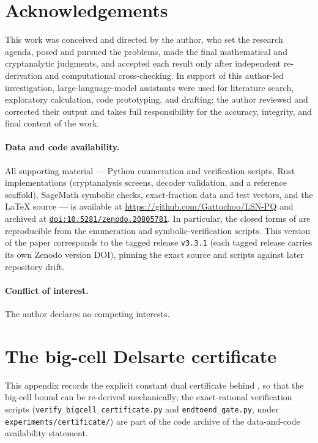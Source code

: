 \documentclass[11pt,a4paper]{article}
\theoremstyle{plain}
\theoremstyle{definition}
\begin{document}

\section*{Acknowledgements}
This work was conceived and directed by the author, who set the research agenda, posed and pursued the problems, made the final mathematical and cryptanalytic judgments, and accepted each result only after independent re-derivation and computational cross-checking. In support of this author-led investigation, large-language-model assistants were used for literature search, exploratory calculation, code prototyping, and drafting; the author reviewed and corrected their output and takes full responsibility for the accuracy, integrity, and final content of the work.

\paragraph{\textbf{Data and code availability.}} All supporting material --- Python enumeration and verification scripts, Rust implementations (cryptanalysis screens, decoder validation, and a reference scaffold), SageMath symbolic checks, exact-fraction data and test vectors, and the \LaTeX{} source --- is available at \url{https://github.com/Gattochoo/LSN-PQ} and archived at \href{https://doi.org/10.5281/zenodo.20805781}{\texttt{doi:10.5281/zenodo.20805781}}. In particular, the closed forms of  are reproducible from the enumeration and symbolic-verification scripts. This version of the paper corresponds to the tagged release \texttt{v3.3.1} (each tagged release carries its own Zenodo version DOI), pinning the exact source and scripts against later repository drift.

\paragraph{\textbf{Conflict of interest.}} The author declares no competing interests.

\section{The big-cell Delsarte certificate}\label{app:bigcell-cert}
This appendix records the explicit constant dual certificate behind , so that the big-cell bound can be re-derived mechanically; the exact-rational verification scripts (\texttt{verify\_bigcell\_certificate.py} and \texttt{endtoend\_gate.py}, under \texttt{experiments/certificate/}) are part of the code archive of the data-and-code availability statement.
\end{document}
